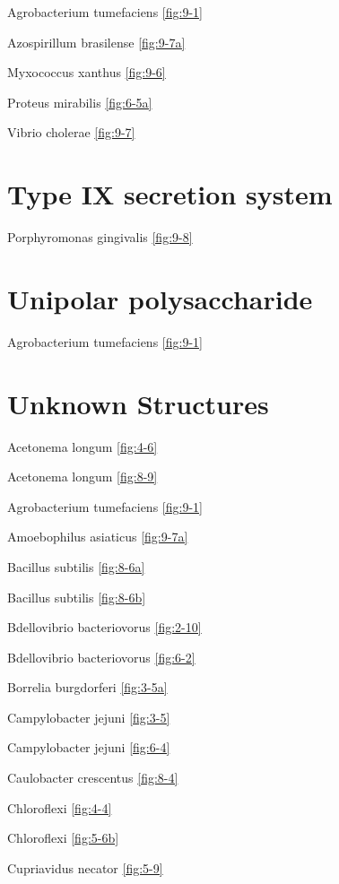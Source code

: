 \documentclass[]{tufte-book}
\begin{document}
Agrobacterium tumefaciens \ref{fig:9-1}

Azospirillum brasilense \ref{fig:9-7a}

Myxococcus xanthus \ref{fig:9-6}

Proteus mirabilis \ref{fig:6-5a}

Vibrio cholerae \ref{fig:9-7}

\section{\texorpdfstring{\textbf{Type IX secretion
system}}{Type IX secretion system}}\label{type-ix-secretion-system}

Porphyromonas gingivalis \ref{fig:9-8}

\section{\texorpdfstring{\textbf{Unipolar
polysaccharide}}{Unipolar polysaccharide}}\label{unipolar-polysaccharide}

Agrobacterium tumefaciens \ref{fig:9-1}

\section{\texorpdfstring{\textbf{Unknown
Structures}}{Unknown Structures}}\label{unknown-structures}

Acetonema longum \ref{fig:4-6}

Acetonema longum \ref{fig:8-9}

Agrobacterium tumefaciens \ref{fig:9-1}

Amoebophilus asiaticus \ref{fig:9-7a}

Bacillus subtilis \ref{fig:8-6a}

Bacillus subtilis \ref{fig:8-6b}

Bdellovibrio bacteriovorus \ref{fig:2-10}

Bdellovibrio bacteriovorus \ref{fig:6-2}

Borrelia burgdorferi \ref{fig:3-5a}

Campylobacter jejuni \ref{fig:3-5}

Campylobacter jejuni \ref{fig:6-4}

Caulobacter crescentus \ref{fig:8-4}

Chloroflexi \ref{fig:4-4}

Chloroflexi \ref{fig:5-6b}

Cupriavidus necator \ref{fig:5-9}
\end{document}
